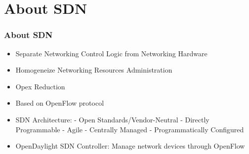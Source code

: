 \section{About SDN}

\begin{frame}

\frametitle{About SDN}

\begin{itemize}
 \item Separate Networking Control Logic from Networking Hardware
	\item Homogeneize Networking Resources Administration
 \item Opex Reduction
	\item Based on OpenFlow protocol
 \item SDN Architecture:\linebreak
	- Open Standards/Vendor-Neutral\linebreak
	- Directly Programmable\linebreak
	- Agile\linebreak
	- Centrally Managed\linebreak
	- Programmatically Configured
 \item OpenDaylight SDN Controller: Manage network devices through OpenFlow\linebreak
\end{itemize}

\end{frame}
